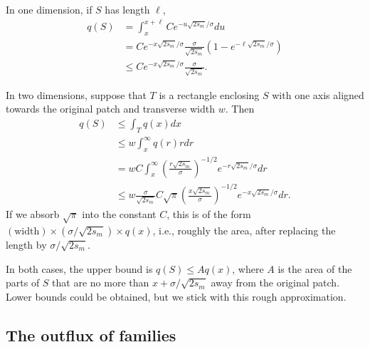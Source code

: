 \documentclass{article}
\begin{document}
In one dimension, if $S$ has length $\ell$,
\begin{align}
    q(S) &= \int_x^{x+\ell} C e^{-u\sqrt{2s_m}/\sigma} du \\
         &= C e^{-x\sqrt{2s_m}/\sigma} \frac{\sigma}{\sqrt{2s_m}} \left( 1 - e^{-\ell\sqrt{2s_m}/\sigma} \right) \\
         &\le C e^{-x\sqrt{2s_m}/\sigma} \frac{\sigma}{\sqrt{2s_m}} .
\end{align}

In two dimensions, 
suppose that $T$ is a rectangle enclosing $S$ with one axis aligned towards the original patch and transverse width $w$.
Then
\begin{align}
    q(S) &\le \int_T q(x) dx \\
        &\le w \int_x^\infty q(r) r dr \\
        &= w C \int_x^\infty \left( \frac{r\sqrt{2s_m}}{\sigma} \right)^{-1/2} e^{-r\sqrt{2s_m}/\sigma} dr \\
        &\le w \frac{\sigma}{\sqrt{2s_m}} C \sqrt{\pi} \left( \frac{x\sqrt{2s_m}}{\sigma} \right)^{-1/2} e^{-x\sqrt{2s_m}/\sigma} dr .
\end{align}
If we absorb $\sqrt{\pi}$ into the constant $C$,
this is of the form $(\text{width}) \times (\sigma/\sqrt{2s_m}) \times q(x)$,
i.e., roughly the area, after replacing the length by $\sigma/\sqrt{2s_m}$.

In both cases,
the upper bound is $q(S) \le A q(x)$,
where $A$ is the area of the parts of $S$ that are no more than $x+\sigma/\sqrt{2s_m}$ away from the original patch.
Lower bounds could be obtained,
but we stick with this rough approximation.

\subsection[Outflux of Families]{The outflux of families}
\label{apx:outflux}
\end{document}
